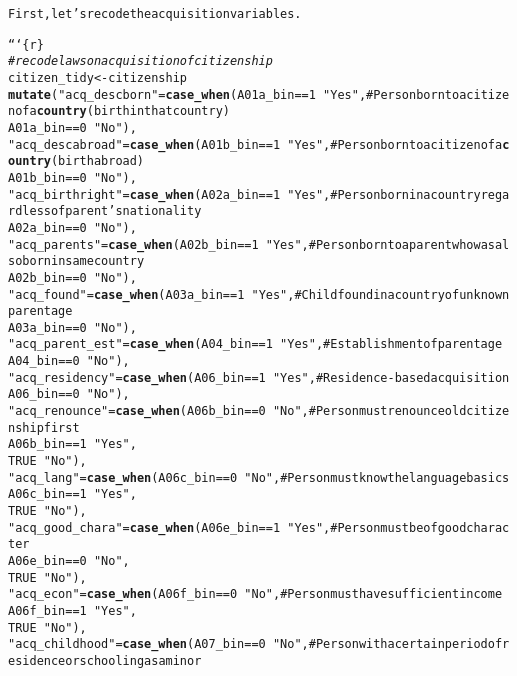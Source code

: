 \documentclass{article}\usepackage[]{graphicx}\usepackage[]{xcolor}
\makeatletter
\newcommand{\hlstr}[1]{\textcolor[rgb]{0.192,0.494,0.8}{#1}}%
\newcommand{\hlcom}[1]{\textcolor[rgb]{0.678,0.584,0.686}{\textit{#1}}}%
\newcommand{\hlkwd}[1]{\textcolor[rgb]{0.737,0.353,0.396}{\textbf{#1}}}%
\newenvironment{kframe}{%
 \def\at@end@of@kframe{}%
 \ifinner\ifhmode%
  \def\at@end@of@kframe{\end{minipage}}%
  \begin{minipage}{\columnwidth}%
 \fi\fi%
 \def\FrameCommand##1{\hskip\@totalleftmargin \hskip-\fboxsep
 \colorbox{shadecolor}{##1}\hskip-\fboxsep
     \hskip-\linewidth \hskip-\@totalleftmargin \hskip\columnwidth}%
 \MakeFramed {\advance\hsize-\width
   \@totalleftmargin\z@ \linewidth\hsize
   \@setminipage}}%
 {\par\unskip\endMakeFramed%
 \at@end@of@kframe}
\newenvironment{knitrout}{}{} %
\makeatother
\begin{document}
\begin{knitrout}
\begin{kframe}
\begin{alltt}
First, let's recode the acquisition variables.

```\{r\}
\hlcom{# recode laws on acquisition of citizenship}
citizen_tidy <- citizenship %>%
  \hlkwd{mutate}(\hlstr{"acq_descborn"} = \hlkwd{case_when}(A01a_bin == 1 ~ \hlstr{"Yes"},   # Person born to a citizen of a \hlkwd{country} (birth in that country)
                                     A01a_bin == 0 ~ \hlstr{"No"}),
         \hlstr{"acq_descabroad"} = \hlkwd{case_when}(A01b_bin == 1 ~ \hlstr{"Yes"}, # Person born to a citizen of a \hlkwd{country} (birth abroad)
                                       A01b_bin == 0 ~ \hlstr{"No"}),
         \hlstr{"acq_birthright"} = \hlkwd{case_when}(A02a_bin == 1 ~ \hlstr{"Yes"}, # Person born in a country regardless of parent's nationality
                                      A02a_bin == 0 ~ \hlstr{"No"}),
         \hlstr{"acq_parents"}  = \hlkwd{case_when} (A02b_bin == 1 ~ \hlstr{"Yes"}, # Person born to a parent who was also born in same country
                                     A02b_bin == 0 ~ \hlstr{"No"}), 
         \hlstr{"acq_found"} = \hlkwd{case_when}(A03a_bin == 1 ~ \hlstr{"Yes"}, # Child found in a country of unknown parentage
                                 A03a_bin == 0 ~ \hlstr{"No"}),
         \hlstr{"acq_parent_est"} = \hlkwd{case_when}(A04_bin == 1 ~ \hlstr{"Yes"}, # Establishment of parentage
                                      A04_bin == 0 ~ \hlstr{"No"}),
         \hlstr{"acq_residency"} = \hlkwd{case_when}(A06_bin == 1 ~ \hlstr{"Yes"}, # Residence-based acquisition
                                     A06_bin == 0 ~ \hlstr{"No"}),
         \hlstr{"acq_renounce"} = \hlkwd{case_when}(A06b_bin == 0 ~ \hlstr{"No"}, # Person must renounce old citizenship first
                                    A06b_bin == 1 ~ \hlstr{"Yes"},
                                    TRUE ~ \hlstr{"No"}),
         \hlstr{"acq_lang"} = \hlkwd{case_when}(A06c_bin == 0 ~ \hlstr{"No"}, # Person must know the language basics
                                A06c_bin == 1 ~ \hlstr{"Yes"},
                                TRUE ~ \hlstr{"No"}),
         \hlstr{"acq_good_chara"} = \hlkwd{case_when}(A06e_bin == 1 ~ \hlstr{"Yes"}, # Person must be of good character
                                      A06e_bin == 0 ~ \hlstr{"No"},
                                      TRUE ~ \hlstr{"No"}),
         \hlstr{"acq_econ"} = \hlkwd{case_when}(A06f_bin == 0 ~ \hlstr{"No"}, # Person must have sufficient income
                                A06f_bin == 1 ~ \hlstr{"Yes"},
                                TRUE ~ \hlstr{"No"}),
         \hlstr{"acq_childhood"} = \hlkwd{case_when}(A07_bin == 0 ~ \hlstr{"No"}, # Person with a certain period of residence or schooling as a minor

\end{alltt}
\end{kframe}
\end{knitrout}
\end{document}
